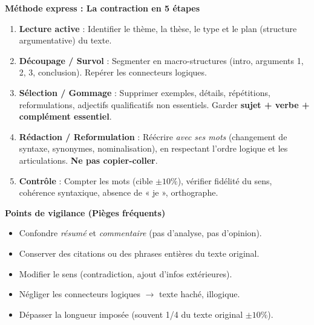 \documentclass[11pt]{article}
\newcommand{\cle}[1]{{\popxbold\color{popdark}#1}}
\begin{document}
\begin{bilan}
\textbf{Méthode express : La contraction en 5 étapes}
\begin{enumerate}
  \item \textbf{Lecture active} : Identifier le \cle{thème}, la \cle{thèse}, le \cle{type} et le \cle{plan} (structure argumentative) du texte.
  \item \textbf{Découpage / Survol} : Segmenter en \cle{macro-structures} (intro, arguments 1, 2, 3, conclusion). Repérer les \cle{connecteurs logiques}.
  \item \textbf{Sélection / Gommage} : Supprimer exemples, détails, répétitions, reformulations, adjectifs qualificatifs non essentiels. Garder \textbf{sujet + verbe + complément essentiel}.
  \item \textbf{Rédaction / Reformulation} : Réécrire \emph{avec ses mots} (changement de syntaxe, synonymes, nominalisation), en respectant l'ordre logique et les articulations. \textbf{Ne pas copier-coller}.
  \item \textbf{Contrôle} : Compter les mots (cible $\pm 10\%$), vérifier fidélité du sens, cohérence syntaxique, absence de « je », orthographe.
\end{enumerate}

\textbf{Points de vigilance (Pièges fréquents)}
\begin{itemize}
  \item Confondre \emph{résumé} et \emph{commentaire} (pas d'analyse, pas d'opinion).
  \item Conserver des citations ou des phrases entières du texte original.
  \item Modifier le sens (contradiction, ajout d'infos extérieures).
  \item Négliger les connecteurs logiques $\rightarrow$ texte haché, illogique.
  \item Dépasser la longueur imposée (souvent 1/4 du texte original $\pm 10\%$).
\end{itemize}

\end{bilan}
\end{document}
